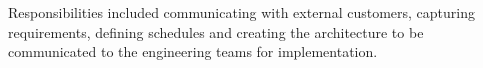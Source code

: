 
\par{ Responsibilities included communicating with external customers, capturing
  requirements, defining schedules and creating the architecture to be
  communicated to the engineering teams for implementation. }
